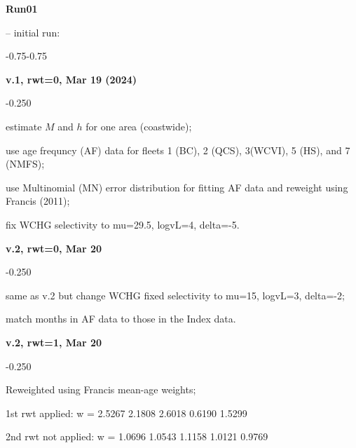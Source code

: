 \hypertarget{R01}{\textbf{Run01}} -- initial run:
\begin{itemize_csas}{-0.75}{-0.75}
	\item \textbf{v.1, rwt=0, Mar 19 (2024)}
	\begin{itemize_csas}{-0.25}{0}
		\item estimate $M$ and $h$ for one area (coastwide);
		\item use age frequncy (AF) data for fleets 1 (BC), 2 (QCS), 3(WCVI), 5 (HS), and 7 (NMFS);
		\item use Multinomial (MN) error distribution for fitting AF data and reweight using Francis (2011);
		\item fix WCHG selectivity to mu=29.5, logvL=4, delta=-5.
	\end{itemize_csas}
	\item \textbf{v.2, rwt=0, Mar 20}
	\begin{itemize_csas}{-0.25}{0}
		\item same as v.2 but change WCHG fixed selectivity to mu=15, logvL=3, delta=-2;
		\item match months in AF data to those in the Index data.
	\end{itemize_csas}
	\item \textbf{v.2, rwt=1, Mar 20}
	\begin{itemize_csas}{-0.25}{0}
		\item Reweighted using Francis mean-age weights;
		\item 1st rwt applied: w =  2.5267 2.1808 2.6018 0.6190 1.5299
		\item 2nd rwt not applied: w = 1.0696 1.0543 1.1158 1.0121 0.9769
	\end{itemize_csas}
\end{itemize_csas}

